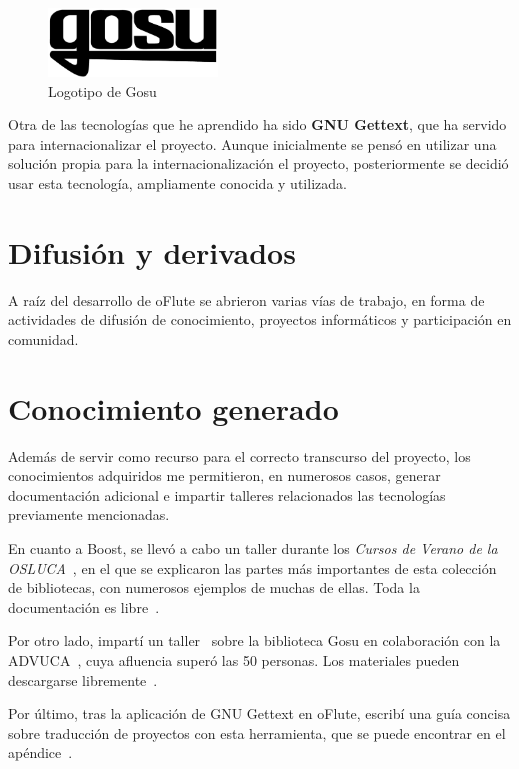 \begin{figure}[htp!]
  \centering
  \includegraphics[width=0.4\textwidth]{8_conclusiones/imagen_logogosu}
  \caption{Logotipo de Gosu}
\end{figure}

Otra de las tecnologías que he aprendido ha sido \textbf{GNU Gettext}, que ha
servido para internacionalizar el proyecto. Aunque inicialmente se pensó en
utilizar una solución propia para la internacionalización el proyecto,
posteriormente se decidió usar esta tecnología, ampliamente conocida y
utilizada.

\section{Difusión y derivados}

A raíz del desarrollo de oFlute se abrieron varias vías de trabajo, en forma de
actividades de difusión de conocimiento, proyectos informáticos y participación
en comunidad.

\section{Conocimiento generado}

Además de servir como recurso para el correcto transcurso del proyecto, los
conocimientos adquiridos me permitieron, en numerosos casos, generar
documentación adicional e impartir talleres relacionados las tecnologías
previamente mencionadas.

En cuanto a Boost, se llevó a cabo un taller durante los \textit{Cursos de
  Verano de la OSLUCA}~\cite{cursosverano}, en el que se explicaron las partes
más importantes de esta colección de bibliotecas, con numerosos ejemplos de
muchas de ellas. Toda la documentación es libre~\cite{materialesCursoBoost}.

Por otro lado, impartí un taller~\cite{tallergosu} sobre la biblioteca Gosu en
colaboración con la ADVUCA~\cite{advuca}, cuya afluencia superó las 50
personas. Los materiales pueden descargarse
libremente~\cite{tallergosumateriales}.

Por último, tras la aplicación de GNU Gettext en oFlute, escribí una guía
concisa sobre traducción de proyectos con esta herramienta, que se puede
encontrar en el apéndice~\textit{}.


